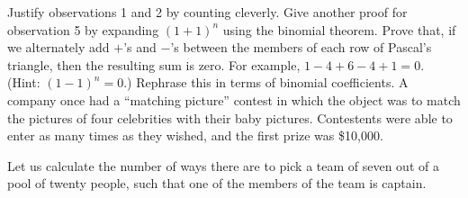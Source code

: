\begin{questions}
  \question Justify observations 1 and 2 by counting cleverly.
  \question Give another proof for observation 5 by expanding $ (1 + 1)^n $ using the binomial theorem.
  \question Prove that, if we alternately add $ +$'s and $ -$'s between the members of each row of Pascal's triangle,
            then the resulting sum is zero. For example, $ 1 - 4 + 6 - 4 + 1 = 0 $. (Hint: $(1 - 1)^n = 0$.) Rephrase
            this in terms of binomial coefficients.
  \question A company once had a ``matching picture'' contest in which the object was to match the pictures of four
            celebrities with their baby pictures. Contestents were able to enter as many times as they wished, and
            the first prize was \$10,000.
  \question Let us calculate the number of ways there are to pick a team of seven out of a pool of twenty people, such that one
            of the members of the team is captain.
\end{questions}
